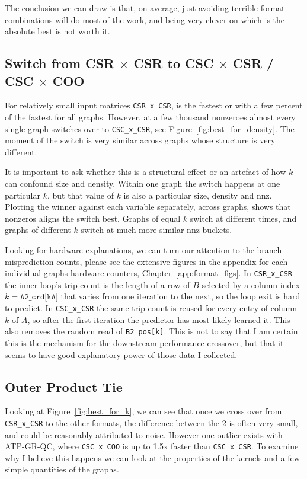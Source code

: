 The conclusion we can draw is that, on average, just avoiding terrible format combinations will do most of the work, and being very clever
on which is the absolute best is not worth it.

\subsection{Switch from CSR $\times$ CSR to CSC $\times$ CSR / CSC $\times$ COO}
For relatively small input matrices \texttt{CSR\_x\_CSR}, is the fastest or with a few percent of the fastest for all graphs. However, at a few thousand nonzeroes
almost every single graph switches over to \texttt{CSC\_x\_CSR}, see Figure~\ref{fig:best_for_density}. The moment of the switch is very similar
across graphs whose structure is very different.

It is important to ask whether this is a structural effect or an artefact of how $k$ can confound size and density. Within one graph the switch happens at one particular $k$, but that value of $k$ is also a particular size, density and nnz. Plotting the winner against each variable separately, across graphs, shows that nonzeros aligns the switch best. Graphs of equal $k$ switch at different times, and graphs of different $k$ switch at much more similar $\mathrm{nnz}$ buckets.

Looking for hardware explanations, we can turn our attention to the branch misprediction counts, please see the
extensive figures in the appendix for each individual graphs hardware counters, Chapter~\ref{app:format_figs}. In \texttt{CSR\_x\_CSR} the inner loop's trip count is the length of a row of $B$ selected by a column index $k=\texttt{A2\_crd[kA]}$ that varies from one iteration to the next, so the loop exit is hard to predict. In \texttt{CSC\_x\_CSR} the same trip count is reused for every entry of column $k$ of $A$, so after the first iteration the predictor has most likely learned it. This also removes the random read of \texttt{B2\_pos[k]}. This is not to say that I am certain this is the mechanism for the downstream performance crossover, but that it seems to have good explanatory power of those data I collected.

\subsection{Outer Product Tie}

Looking at Figure~\ref{fig:best_for_k}, we can see that once we cross over from \texttt{CSR\_x\_CSR} to the other formats, the difference between the 2 is often
very small, and could be reasonably attributed to noise. However one outlier exists with ATP-GR-QC, where \texttt{CSC\_x\_COO} is up to 1.5x faster than \texttt{CSC\_x\_CSR}. To examine why I believe this happens we can look at the properties of the kernels and a few simple quantities of the graphs.

